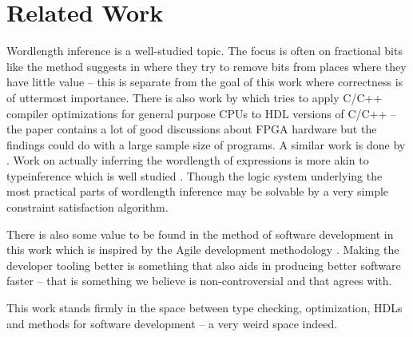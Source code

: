\chapter{Related Work}
Wordlength inference is a well-studied topic. The focus is often on fractional bits like the method \citeauthor{src:MinOfFrac} suggests in \cite{src:MinOfFrac} where they try to remove bits from places where they have little value -- this is separate from the goal of this work where correctness is of uttermost importance. There is also work \cite{src:HLSandOpt} by \citeauthor{src:HLSandOpt} which tries to apply C/C++ compiler optimizations for general purpose CPUs to HDL versions of C/C++ -- the paper contains a lot of good discussions about FPGA hardware but the findings could do with a large sample size of programs. A similar work is done by \citeauthor{src:ConFPGA}. Work on actually inferring the wordlength of expressions is more akin to typeinference which is well studied \cite{src:DamasHindleyMilner, src:TypeCheckersBook, src:BiTy}. Though the logic system underlying the most practical parts of wordlength inference may be solvable by a very simple constraint satisfaction algorithm.

There is also some value to be found in the method of software development in this work which is inspired by the Agile development methodology \cite{src:Agile}. Making the developer tooling better is something that also aids in producing better software faster -- that is something we believe is non-controversial and that \cite{src:Agile} agrees with.

This work stands firmly in the space between type checking, optimization, HDLs and methods for software development -- a very weird space indeed.
